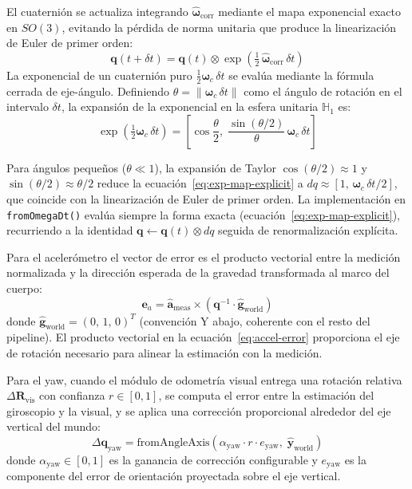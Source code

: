El cuaternión se actualiza integrando
$\hat{\boldsymbol{\omega}}_{\text{corr}}$ mediante el mapa exponencial exacto
en $SO(3)$, evitando la pérdida de norma unitaria que produce la linearización
de Euler de primer orden:
%
\begin{equation}
  \label{eq:exp-map}
  \mathbf{q}(t+\delta t) =
  \mathbf{q}(t) \otimes \exp\!\left(\tfrac{1}{2}\,
  \hat{\boldsymbol{\omega}}_{\text{corr}}\,\delta t\right)
\end{equation}
%
La exponencial de un cuaternión puro $\tfrac{1}{2}\boldsymbol{\omega}_c\,\delta t$
se evalúa mediante la fórmula cerrada de eje-ángulo. Definiendo
$\theta = \|\boldsymbol{\omega}_c\,\delta t\|$ como el ángulo de rotación en el
intervalo $\delta t$, la expansión de la exponencial en la esfera unitaria
$\mathbb{H}_1$ es:
%
\begin{equation}
  \label{eq:exp-map-explicit}
  \exp\!\left(\tfrac{1}{2}\boldsymbol{\omega}_c\,\delta t\right)
  = \left[\cos\frac{\theta}{2},\;
          \frac{\sin(\theta/2)}{\theta}\,\boldsymbol{\omega}_c\,\delta t\right]
\end{equation}
%

Para ángulos pequeños ($\theta \ll 1$), la expansión de Taylor
$\cos(\theta/2) \approx 1$ y $\sin(\theta/2) \approx \theta/2$ reduce la
ecuación~\ref{eq:exp-map-explicit} a $dq \approx [1,\,\boldsymbol{\omega}_c\,\delta t/2]$,
que coincide con la linearización de Euler de primer orden. La implementación
en \texttt{fromOmegaDt()} evalúa siempre la forma exacta
(ecuación~\ref{eq:exp-map-explicit}), recurriendo a la identidad
$\mathbf{q} \leftarrow \mathbf{q}(t) \otimes dq$ seguida de
renormalización explícita.

Para el acelerómetro el vector de error es el producto vectorial entre la
medición normalizada y la dirección esperada de la gravedad transformada al
marco del cuerpo:
%
\begin{equation}
  \label{eq:accel-error}
  \mathbf{e}_a =
  \hat{\mathbf{a}}_{\text{meas}} \times
  \left(\mathbf{q}^{-1} \cdot \hat{\mathbf{g}}_{\text{world}}\right)
\end{equation}
%
donde $\hat{\mathbf{g}}_{\text{world}} = (0,\,1,\,0)^T$ (convención Y abajo,
coherente con el resto del pipeline). El producto vectorial en la
ecuación~\ref{eq:accel-error} proporciona el eje de rotación necesario para
alinear la estimación con la medición.

Para el yaw, cuando el módulo de odometría visual entrega una rotación relativa
$\Delta\mathbf{R}_{\text{vis}}$ con confianza $r \in [0,1]$, se computa el
error entre la estimación del giroscopio y la visual, y se aplica una
corrección proporcional alrededor del eje vertical del mundo:
%
\begin{equation}
  \label{eq:yaw-correction}
  \Delta\mathbf{q}_{\text{yaw}} =
  \text{fromAngleAxis}\!\left(\alpha_{\text{yaw}}\cdot r \cdot e_{\text{yaw}},\;
  \hat{\mathbf{y}}_{\text{world}}\right)
\end{equation}
%
donde $\alpha_{\text{yaw}} \in [0,1]$ es la ganancia de corrección configurable
y $e_{\text{yaw}}$ es la componente del error de orientación proyectada sobre
el eje vertical.

